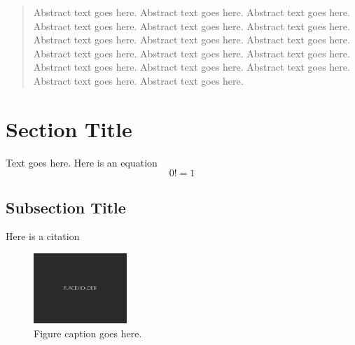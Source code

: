 \documentclass[10pt]{article}
\begin{document}
\frontmatter


\begin{abstract}
\noindent Abstract text goes here. Abstract text goes here. Abstract text goes here. Abstract text goes here. Abstract text goes here. Abstract text goes here. Abstract text goes here. Abstract text goes here. Abstract text goes here. Abstract text goes here. Abstract text goes here. Abstract text goes here. Abstract text goes here. Abstract text goes here. Abstract text goes here. Abstract text goes here. Abstract text goes here.
\end{abstract}



\section{Section Title}

Text goes here. Here is an equation
%
\begin{equation}
0! = 1
\end{equation}



\subsection{Subsection Title}

Here is a citation \cite{cite1}

\begin{figure}[H]
\hypertarget{fig1}{}
\centering
\includegraphics[width=100pt]{Figures/Placeholder.png}
\caption{Figure caption goes here.}
\end{figure}





\end{document}
